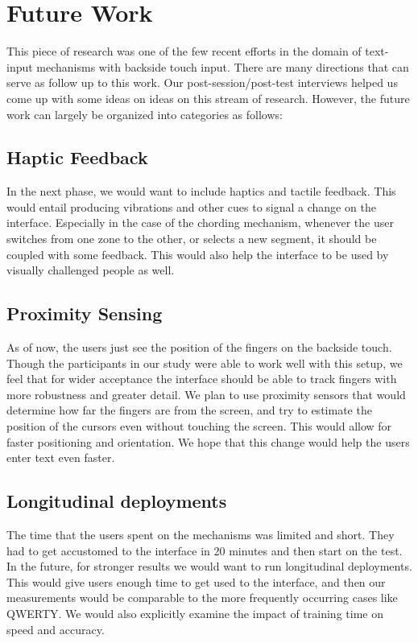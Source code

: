 \section{Future Work}

This piece of research was one of the few recent efforts in the domain
of text-input mechanisms with backside touch input. There are many
directions that can serve as follow up to this work. Our post-session/post-test interviews helped us come up with some ideas on  ideas on this stream of research. However, the
future work can largely be organized into categories as follows:

\subsection{Haptic Feedback}

In the next phase, we would want to include haptics and tactile
feedback. This would entail producing vibrations and other cues to
signal a change on the interface. Especially in the case of the
chording mechanism, whenever the user switches from one zone to the
other, or selects a new segment, it should be coupled with some
feedback. This would also help the interface to be used by visually
challenged people as well.

\subsection{Proximity Sensing}

As of now, the users just see the position of the fingers on the
backside touch. Though the participants in our study were able to work
well with this setup, we feel that for wider acceptance the interface
should be able to track fingers with more robustness and greater
detail. We plan to use proximity sensors that would determine how far
the fingers are from the screen, and try to estimate the position of
the cursors even without touching the screen. This would allow for
faster positioning and orientation. We hope that this change would
help the users enter text even faster.

\subsection{Longitudinal deployments} 

The time that the users spent on the mechanisms was limited and
short. They had to get accustomed to the interface in 20 minutes and
then start on the test. In the future, for stronger results we would
want to run longitudinal deployments. This would give users enough
time to get used to the interface, and then our measurements would be
comparable to the more frequently occurring cases like QWERTY. We would also explicitly examine the impact of training time on speed and accuracy.

